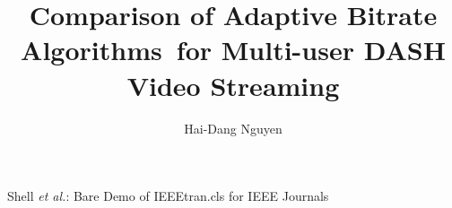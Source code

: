 \documentclass[journal]{IEEEtran}
\begin{document}
%
\title{Comparison of Adaptive Bitrate Algorithms for Multi-user DASH Video Streaming}
%
%
%

\author{Hai-Dang Nguyen}


% 
%



%
{Shell \MakeLowercase{\textit{et al.}}: Bare Demo of IEEEtran.cls for IEEE Journals}
% 
\end{document}
